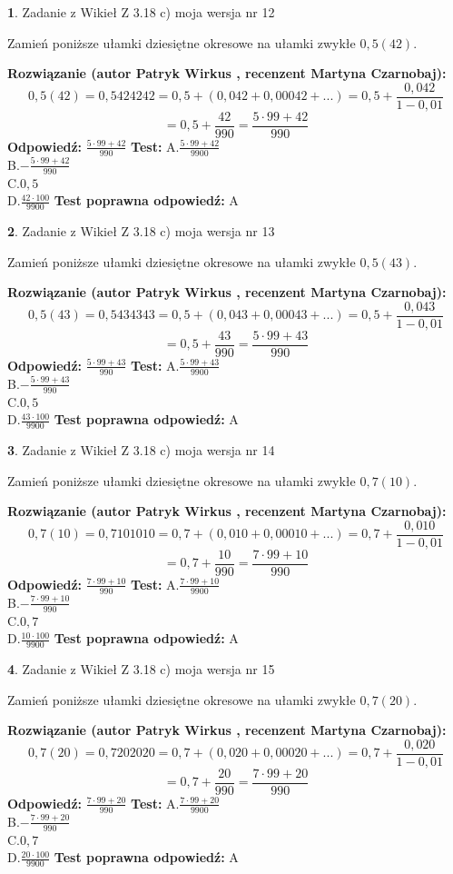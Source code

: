 \documentclass[12pt, a4paper]{article}
\theoremstyle{definition} %
\newtheorem{zad}{}
\newcommand{\zadStart}[1]{\begin{zad}#1\newline}
\newcommand{\zadStop}{\end{zad}}
\newcommand{\rozwStart}[2]{\noindent \textbf{Rozwiązanie (autor #1 , recenzent #2): }\newline}
\newcommand{\rozwStop}{\newline}
\newcommand{\odpStart}{\noindent \textbf{Odpowiedź:}\newline}
\newcommand{\odpStop}{\newline}
\newcommand{\testStart}{\noindent \textbf{Test:}\newline}
\newcommand{\testStop}{\newline}
\newcommand{\kluczStart}{\noindent \textbf{Test poprawna odpowiedź:}\newline}
\newcommand{\kluczStop}{\newline}
\begin{document}
\zadStart{Zadanie z Wikieł Z 3.18 c) moja wersja nr 12}

Zamień poniższe ułamki dziesiętne okresowe na ułamki zwykłe $0,5(42)$.
\zadStop
\rozwStart{Patryk Wirkus}{Martyna Czarnobaj}
$$0,5(42)=0,5424242=0,5+(0,042+0,00042+...)=0,5+\frac{0,042}{1-0,01}$$
$$=0,5+\frac{42}{990}=\frac{5\cdot99+42}{990}$$
\rozwStop
\odpStart
$\frac{5\cdot99+42}{990}$
\odpStop
\testStart
A.$\frac{5\cdot99+42}{9900}$\\ B.$-\frac{5\cdot99+42}{990}$\\ C.$0,5$\\ D.$\frac{42\cdot100}{9900}$
\testStop
\kluczStart
A
\kluczStop



\zadStart{Zadanie z Wikieł Z 3.18 c) moja wersja nr 13}

Zamień poniższe ułamki dziesiętne okresowe na ułamki zwykłe $0,5(43)$.
\zadStop
\rozwStart{Patryk Wirkus}{Martyna Czarnobaj}
$$0,5(43)=0,5434343=0,5+(0,043+0,00043+...)=0,5+\frac{0,043}{1-0,01}$$
$$=0,5+\frac{43}{990}=\frac{5\cdot99+43}{990}$$
\rozwStop
\odpStart
$\frac{5\cdot99+43}{990}$
\odpStop
\testStart
A.$\frac{5\cdot99+43}{9900}$\\ B.$-\frac{5\cdot99+43}{990}$\\ C.$0,5$\\ D.$\frac{43\cdot100}{9900}$
\testStop
\kluczStart
A
\kluczStop



\zadStart{Zadanie z Wikieł Z 3.18 c) moja wersja nr 14}

Zamień poniższe ułamki dziesiętne okresowe na ułamki zwykłe $0,7(10)$.
\zadStop
\rozwStart{Patryk Wirkus}{Martyna Czarnobaj}
$$0,7(10)=0,7101010=0,7+(0,010+0,00010+...)=0,7+\frac{0,010}{1-0,01}$$
$$=0,7+\frac{10}{990}=\frac{7\cdot99+10}{990}$$
\rozwStop
\odpStart
$\frac{7\cdot99+10}{990}$
\odpStop
\testStart
A.$\frac{7\cdot99+10}{9900}$\\ B.$-\frac{7\cdot99+10}{990}$\\ C.$0,7$\\ D.$\frac{10\cdot100}{9900}$
\testStop
\kluczStart
A
\kluczStop



\zadStart{Zadanie z Wikieł Z 3.18 c) moja wersja nr 15}

Zamień poniższe ułamki dziesiętne okresowe na ułamki zwykłe $0,7(20)$.
\zadStop
\rozwStart{Patryk Wirkus}{Martyna Czarnobaj}
$$0,7(20)=0,7202020=0,7+(0,020+0,00020+...)=0,7+\frac{0,020}{1-0,01}$$
$$=0,7+\frac{20}{990}=\frac{7\cdot99+20}{990}$$
\rozwStop
\odpStart
$\frac{7\cdot99+20}{990}$
\odpStop
\testStart
A.$\frac{7\cdot99+20}{9900}$\\ B.$-\frac{7\cdot99+20}{990}$\\ C.$0,7$\\ D.$\frac{20\cdot100}{9900}$
\testStop
\kluczStart
A
\kluczStop
\end{document}
